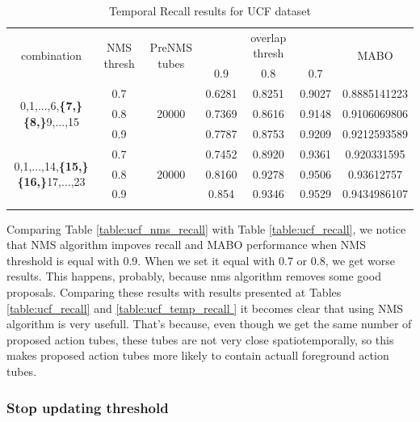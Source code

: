 \documentclass{report}
\begin{document}
\begin{center}
  \setlength{\tabcolsep}{2.2pt}
\begin{longtable}{||c | c | c | c c c| c|}

  \hline
  \multirow{2}{*}{combination} & \multirow{2}{2.5em}{NMS thresh} & \multirow{2}{3.5em}{PreNMS tubes} &  {} &overlap thresh & {} & \multirow{2}{*}{MABO} \\
  {} & {} & {} &  0.9 &  0.8 & 0.7 & {}\\         
  \hline
  \multirow{3}{7em}{0,1,...,6,\textbf{\{7,\}}
  \textbf{\{8,\}}9,...,15 }  & 0.7 &\multirow{3}{*}{20000}  & 0.6281 & 0.8251 & 0.9027 & 0.8885141223  \\
  \cline{2-2} \cline{4-7} 
  {} &  0.8   & {}   & 0.7369 & 0.8616 & 0.9148 & 0.9106069806 \\
  \cline{2-2} \cline{4-7} 
  {} &  0.9   & {}   &  0.7787 & 0.8753 & 0.9209 & 0.9212593589 \\
  \hline                                    
  \multirow{3}{7em}{0,1,...,14,\textbf{\{15,\}}
  \textbf{\{16,\}}17,...,23 }  & 0.7 & \multirow{3}{*}{20000}   & 0.7452 & 0.8920 & 0.9361 & 0.920331595 \\
  \cline{2-2} \cline{4-7} 
  {} &  0.8   & {}   & 0.8160 & 0.9278 & 0.9506 & 0.93612757 \\
  \cline{2-2} \cline{4-7} 
  {} &  0.9   & {}   & 0.854 & 0.9346 & 0.9529 & 0.9434986107 \\
  \hline                                    

  \caption{Temporal Recall results for UCF dataset}
  \label{table:ucf_nms_temp_recall}
\end{longtable} 
\end{center}

Comparing Table \ref{table:ucf_nms_recall} with Table \ref{table:ucf_recall},  we notice that NMS algorithm impoves recall and MABO
performance when NMS threshold is equal with 0.9. When we set it equal with 0.7 or 0.8, we get worse results. This happens, probably, because
nms algorithm removes some good proposals. Comparing these results with results presented at Tables \ref{table:ucf_recall} and \ref{table:ucf_temp_recall } it becomes clear that using NMS algorithm is very usefull. That's because, even though we get the same number of proposed action tubes,
these tubes are not very close spatiotemporally, so this makes proposed action tubes more likely to contain actuall foreground action tubes.

\subsubsection{Stop updating threshold}
\end{document}
